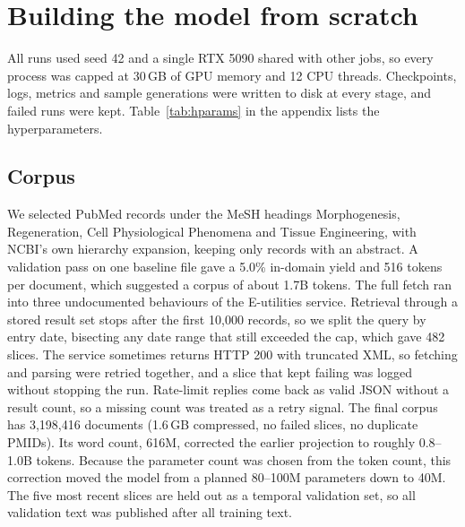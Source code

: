 \documentclass[11pt]{article}
\begin{document}
\section{Building the model from scratch}
\label{sec:scratch}

All runs used seed 42 and a single RTX 5090 shared with other jobs, so
every process was capped at 30\,GB of GPU memory and 12 CPU threads.
Checkpoints, logs, metrics and sample generations were written to disk at
every stage, and failed runs were kept. Table~\ref{tab:hparams} in the
appendix lists the hyperparameters.

\subsection{Corpus}
We selected PubMed records under the MeSH headings Morphogenesis,
Regeneration, Cell Physiological Phenomena and Tissue Engineering, with
NCBI's own hierarchy expansion, keeping only records with an abstract. A
validation pass on one baseline file gave a 5.0\% in-domain yield and 516
tokens per document, which suggested a corpus of about 1.7B tokens. The
full fetch ran into three undocumented behaviours of the E-utilities
service. Retrieval through a stored result set stops after the first
10{,}000 records, so we split the query by entry date, bisecting any date
range that still exceeded the cap, which gave 482 slices. The service
sometimes returns HTTP 200 with truncated XML, so fetching and parsing were
retried together, and a slice that kept failing was logged without stopping
the run. Rate-limit replies come back as valid JSON without a result count,
so a missing count was treated as a retry signal. The final corpus has
3,198,416 documents (1.6\,GB compressed, no failed slices, no duplicate
PMIDs). Its word count, 616M, corrected the earlier projection to roughly
0.8--1.0B tokens. Because the parameter count was chosen from the token
count, this correction moved the model from a planned 80--100M parameters
down to 40M. The five most recent slices are held out as a temporal
validation set, so all validation text was published after all training
text.
\end{document}
